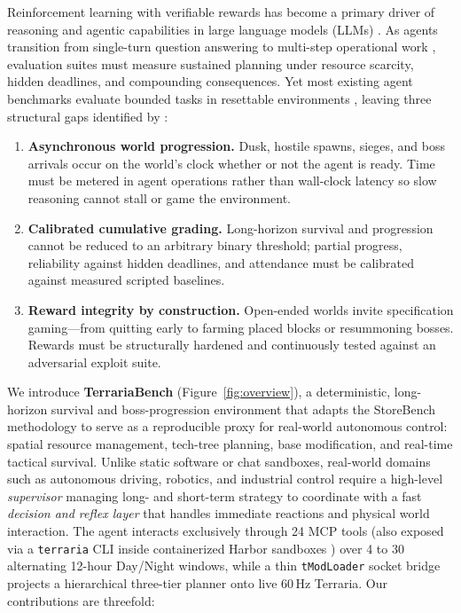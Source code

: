 \documentclass[10pt,letterpaper]{article}
\begin{document}
Reinforcement learning with verifiable rewards has become a primary driver of reasoning and agentic capabilities in large language models (LLMs) \citep{deepseek2025r1,lambert2025tulu3}. As agents transition from single-turn question answering to multi-step operational work \citep{kwa2025measuring,patwardhan2025gdpval}, evaluation suites must measure sustained planning under resource scarcity, hidden deadlines, and compounding consequences. Yet most existing agent benchmarks evaluate bounded tasks in resettable environments \citep{jimenez2024swebench,zhou2024webarena,yao2025taubench}, leaving three structural gaps identified by \citet{raghuvanshi2026storebench}:
\begin{enumerate}[leftmargin=18pt,itemsep=2pt]
  \item \textbf{Asynchronous world progression.} Dusk, hostile spawns, sieges, and boss arrivals occur on the world's clock whether or not the agent is ready. Time must be metered in agent operations rather than wall-clock latency so slow reasoning cannot stall or game the environment.
  \item \textbf{Calibrated cumulative grading.} Long-horizon survival and progression cannot be reduced to an arbitrary binary threshold; partial progress, reliability against hidden deadlines, and attendance must be calibrated against measured scripted baselines.
  \item \textbf{Reward integrity by construction.} Open-ended worlds invite specification gaming---from quitting early to farming placed blocks or resummoning bosses. Rewards must be structurally hardened and continuously tested against an adversarial exploit suite.
\end{enumerate}

We introduce \textbf{TerrariaBench} (Figure~\ref{fig:overview}), a deterministic, long-horizon survival and boss-progression environment that adapts the StoreBench methodology \citep{raghuvanshi2026storebench} to serve as a reproducible proxy for real-world autonomous control: spatial resource management, tech-tree planning, base modification, and real-time tactical survival. Unlike static software or chat sandboxes, real-world domains such as autonomous driving, robotics, and industrial control require a high-level \emph{supervisor} managing long- and short-term strategy to coordinate with a fast \emph{decision and reflex layer} that handles immediate reactions and physical world interaction. The agent interacts exclusively through 24 MCP tools (also exposed via a \texttt{terraria} CLI inside containerized Harbor sandboxes \citep{harbor2026}) over 4 to 30 alternating 12-hour Day/Night windows, while a thin \texttt{tModLoader} socket bridge projects a hierarchical three-tier planner onto live 60\,Hz Terraria. Our contributions are threefold:
\end{document}
